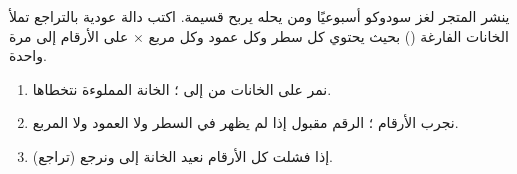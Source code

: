 \begin{statement}
ينشر المتجر لغز سودوكو أسبوعيًا ومن يحله يربح قسيمة. اكتب دالة عودية بالتراجع  تملأ الخانات الفارغة () بحيث يحتوي كل سطر وكل عمود وكل مربع × على الأرقام  إلى  مرة واحدة.
\end{statement}
\begin{stepsbox}\begin{enumerate}
\item نمر على الخانات من  إلى ؛ الخانة المملوءة نتخطاها.
\item نجرب الأرقام ؛ الرقم مقبول إذا لم يظهر في السطر ولا العمود ولا المربع.
\item إذا فشلت كل الأرقام نعيد الخانة إلى  ونرجع  (تراجع).
\end{enumerate}\end{stepsbox}
